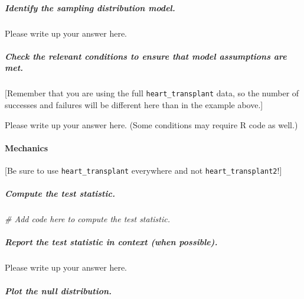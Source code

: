 \documentclass[
]{book}
\newenvironment{Shaded}{\begin{snugshade}}{\end{snugshade}}
\newcommand{\CommentTok}[1]{\textcolor[rgb]{0.56,0.35,0.01}{\textit{#1}}}
\begin{document}
\hypertarget{identify-the-sampling-distribution-model.-2}{%
\subparagraph*{Identify the sampling distribution model.}\label{identify-the-sampling-distribution-model.-2}}

Please write up your answer here.

\hypertarget{check-the-relevant-conditions-to-ensure-that-model-assumptions-are-met.-3}{%
\subparagraph*{Check the relevant conditions to ensure that model assumptions are met.}\label{check-the-relevant-conditions-to-ensure-that-model-assumptions-are-met.-3}}

{[}Remember that you are using the full \texttt{heart\_transplant} data, so the number of successes and failures will be different here than in the example above.{]}

Please write up your answer here. (Some conditions may require R code as well.)

\hypertarget{mechanics-2}{%
\paragraph*{Mechanics}\label{mechanics-2}}

{[}Be sure to use \texttt{heart\_transplant} everywhere and not \texttt{heart\_transplant2}!{]}

\hypertarget{compute-the-test-statistic.-2}{%
\subparagraph*{Compute the test statistic.}\label{compute-the-test-statistic.-2}}

\begin{Shaded}
\begin{Highlighting}[]
\CommentTok{\# Add code here to compute the test statistic.}
\end{Highlighting}
\end{Shaded}

\hypertarget{report-the-test-statistic-in-context-when-possible.-2}{%
\subparagraph*{Report the test statistic in context (when possible).}\label{report-the-test-statistic-in-context-when-possible.-2}}

Please write up your answer here.

\hypertarget{plot-the-null-distribution.-2}{%
\subparagraph*{Plot the null distribution.}\label{plot-the-null-distribution.-2}}
\end{document}

